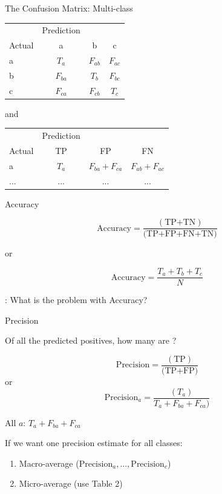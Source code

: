 \documentclass[10pt,handout]{beamer}
\begin{document}
\begin{frame}{The Confusion Matrix: Multi-class}

\centering
\begin{tabular}{lccc}
  & Prediction &  \\
  Actual & a & b & c \\
  a & $T_a$ & $F_{ab}$ & $F_{ac}$ \\
  b & $F_{ba}$ & $T_b$ & $F_{bc}$ \\
  c & $F_{ca}$ & $F_{cb}$ & $T_c$ \\
\end{tabular}
and
\centering
\begin{tabular}{lccc}
  & Prediction &  \\
  Actual & TP & FP & FN \\
  a & $T_a$ & $F_{ba} + F_{ca}$ & $F_{ab} + F_{ac}$ \\
  ... & ... & ... & ...
\end{tabular}



\end{frame}


\begin{frame}{Accuracy}


\[
\text{Accuracy} = \frac{(\text{TP+TN})}{\text{(TP+FP+FN+TN)}}
\]

or

\[
\text{Accuracy} = \frac{T_a + T_b + T_c}{N}
\]

\pause


: What is the problem with Accuracy?

\end{frame}


\begin{frame}{Precision}

Of all the predicted positives, how many are ?

\[
\text{Precision} = \frac{(\text{TP})}{\text{(TP+FP)}}
\]
or
\[
\text{Precision}_a = \frac{(T_a)}{T_a + F_{ba} + F_{ca})}
\]

All  $a$: $T_a + F_{ba} + F_{ca}$

If we want one precision estimate for all classes:
\begin{enumerate}
\item Macro-average ($\text{Precision}_a, ..., \text{Precision}_c$)
\item Micro-average (use Table 2)
\end{enumerate}

\end{frame}
\end{document}
